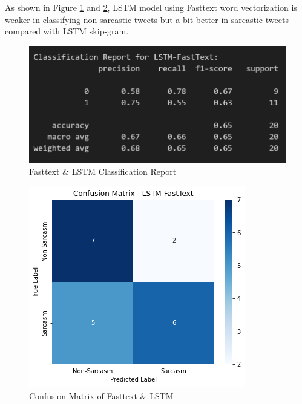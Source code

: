 \documentclass[11pt]{article}
\begin{document}
As shown in Figure \ref{fig:ftlstmcr} and \ref{fig:ftlstmcm}, LSTM model using Fasttext word vectorization is weaker in classifying non-sarcastic tweets but a bit better in sarcastic tweets compared with LSTM skip-gram.
\begin{figure}[htbp]
    \centering
    \includegraphics[width=.8\linewidth]{pic/LSTM-fasttext-Report.png}
    \caption{Fasttext \& LSTM Classification Report}
    \label{fig:ftlstmcr}
\end{figure}
\begin{figure}[htbp]
    \centering
    \includegraphics[width=.8\linewidth]{pic/LSTM-fasttext-Matrix.png}
    \caption{Confusion Matrix of Fasttext \& LSTM}
    \label{fig:ftlstmcm}
\end{figure}
\end{document}

